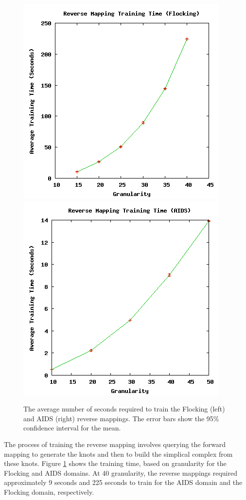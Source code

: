 \begin{figure}[ht]
\centering
\includegraphics[scale=.5]{images/results_flocking/rmtraining.png}
\includegraphics[scale=.5]{images/results_aids/aids-rmtraining.png}
\caption{The average number of seconds required to train the Flocking (left) and AIDS (right) reverse mappings.
The error bars show the 95\% confidence interval for the mean.}
\label{fig:farmtraining}
\end{figure}



The process of training the reverse mapping involves querying the forward mapping to generate the knots and then to build the simplical complex from these knots.
Figure \ref{fig:farmtraining} shows the training time, based on granularity for the Flocking and AIDS domains.
At 40 granularity, the reverse mappings required approximately 9 seconds and 225 seconds to train for the AIDS domain and the Flocking domain, respectively.

